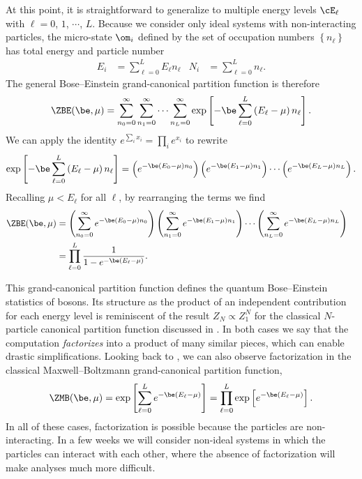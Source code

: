 At this point, it is straightforward to generalize to multiple energy levels $\cE_{\ell}$ with $\ell = 0$, $1$, $\cdots$, $L$.
Because we consider only ideal systems with non-interacting particles, the micro-state $\om_i$ defined by the set of occupation numbers $\left\{n_{\ell}\right\}$ has total energy and particle number
\begin{align}
  \label{eq:total_energy_levels}
  E_i & = \sum_{\ell = 0}^L E_{\ell} n_{\ell} &
  N_i & = \sum_{\ell = 0}^L n_{\ell}.
\end{align}
The general Bose--Einstein grand-canonical partition function is therefore
\begin{equation*}
  \ZBE(\be, \mu) = \sum_{n_0 = 0}^{\infty} \sum_{n_1 = 0}^{\infty} \cdots \sum_{n_L = 0}^{\infty} \exp\left[-\be\sum_{\ell = 0}^L \left(E_{\ell} - \mu\right) n_{\ell}\right].
\end{equation*}
We can apply the identity $e^{\sum_i x_i} = \prod_i e^{x_i}$ to rewrite
\begin{equation*}
  \exp\left[-\be\sum_{\ell = 0}^L \left(E_{\ell} - \mu\right) n_{\ell}\right] = \left(e^{-\be (E_0 - \mu) n_0}\right) \left(e^{-\be (E_1 - \mu) n_1}\right)\cdots \left(e^{-\be (E_L - \mu) n_L}\right).
\end{equation*}
Recalling $\mu < E_{\ell}$ for all $\ell$, by rearranging the terms we find
\begin{align}
  \ZBE(\be, \mu) & = \left(\sum_{n_0 = 0}^{\infty} e^{-\be (E_0 - \mu) n_0}\right) \left(\sum_{n_1 = 0}^{\infty} e^{-\be (E_1 - \mu) n_1}\right)\cdots \left(\sum_{n_L = 0}^{\infty} e^{-\be (E_L - \mu) n_L}\right) \cr
                 & = \prod_{\ell = 0}^L \frac{1}{1 - e^{-\be (E_{\ell} - \mu)}}. \label{eq:partfunc_BE}
\end{align}

This grand-canonical partition function defines the quantum Bose--Einstein statistics of bosons.
Its structure as the product of an independent contribution for each energy level is reminiscent of the result $Z_N \propto Z_1^N$ for the classical $N$-particle canonical partition function discussed in .
In both cases we say that the computation \textit{factorizes} into a product of many similar pieces, which can enable drastic simplifications.
Looking back to , we can also observe factorization in the classical Maxwell--Boltzmann grand-canonical partition function,
\begin{equation}
  \label{eq:partfunc_MB}
  \ZMB(\be, \mu) = \exp\left[\sum_{\ell = 0}^L e^{-\be\left(E_{\ell} - \mu\right)}\right] = \prod_{\ell = 0}^L \exp\left[e^{-\be\left(E_{\ell} - \mu\right)}\right].
\end{equation}
In all of these cases, factorization is possible because the particles are non-interacting.
In a few weeks we will consider non-ideal systems in which the particles can interact with each other, where the absence of factorization will make analyses much more difficult.



